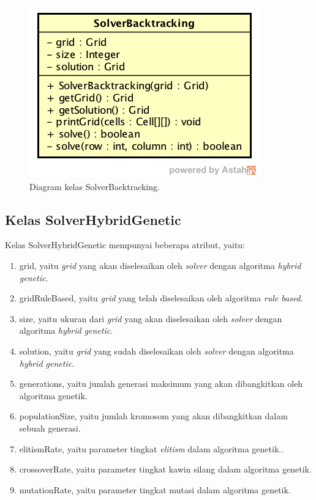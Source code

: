 \begin{figure}
\centering
\captionsetup{justification=centering}
\includegraphics[scale=0.5]{Gambar/Perancangan/DiagramKelasSolverBacktracking.png}
\caption[Diagram kelas SolverBacktracking.]{Diagram kelas SolverBacktracking.}
\label{fig:diagramkelassolverbt}
\end{figure}

\subsection{Kelas SolverHybridGenetic}
\label{sec:kelassolverhg}

Kelas SolverHybridGenetic mempunyai beberapa atribut, yaitu:

\begin{enumerate}
\item grid, yaitu \textit{grid} yang akan diselesaikan oleh \textit{solver} dengan algoritma \textit{hybrid genetic}.
\item gridRuleBased, yaitu \textit{grid} yang telah diselesaikan oleh algoritma \textit{rule based}.
\item size, yaitu ukuran dari \textit{grid} yang akan diselesaikan oleh \textit{solver} dengan algoritma \textit{hybrid genetic}.
\item solution, yaitu \textit{grid} yang sudah diselesaikan oleh \textit{solver} dengan algoritma \textit{hybrid genetic}.
\item generations, yaitu jumlah generasi maksimum yang akan dibangkitkan oleh algoritma genetik.
\item populationSize, yaitu jumlah kromosom yang akan dibangkitkan dalam sebuah generasi.
\item elitismRate, yaitu parameter tingkat \textit{elitism} dalam algoritma genetik..
\item crossoverRate, yaitu parameter tingkat kawin silang dalam algoritma genetik.
\item mutationRate, yaitu parameter tingkat mutasi dalam algoritma genetik.
\end{enumerate}

